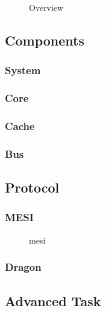 
\begin{figure}[ht]
    \centering
    \caption{Overview}
    \label{fig:overview}
\end{figure}


\subsection{Components}


\subsubsection{System}

\subsubsection{Core}

\subsubsection{Cache}

\subsubsection{Bus}

\subsection{Protocol}

\subsubsection{MESI}

\begin{figure}[ht]
    \centering
    \caption{mesi}
    \label{fig:mesi}
\end{figure}

\subsubsection{Dragon}

\subsection{Advanced Task}

